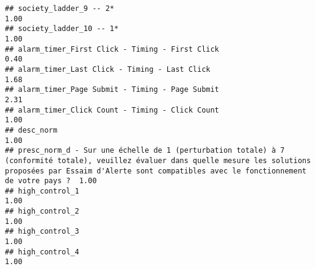 \documentclass[
]{article}
\begin{document}
\begin{verbatim}
## society_ladder_9 -- 2*                                                                                                                                                                                                      1.00
## society_ladder_10 -- 1*                                                                                                                                                                                                     1.00
## alarm_timer_First Click - Timing - First Click                                                                                                                                                                              0.40
## alarm_timer_Last Click - Timing - Last Click                                                                                                                                                                                1.68
## alarm_timer_Page Submit - Timing - Page Submit                                                                                                                                                                              2.31
## alarm_timer_Click Count - Timing - Click Count                                                                                                                                                                              1.00
## desc_norm                                                                                                                                                                                                                   1.00
## presc_norm_d - Sur une échelle de 1 (perturbation totale) à 7 (conformité totale), veuillez évaluer dans quelle mesure les solutions proposées par Essaim d'Alerte sont compatibles avec le fonctionnement de votre pays ?  1.00
## high_control_1                                                                                                                                                                                                              1.00
## high_control_2                                                                                                                                                                                                              1.00
## high_control_3                                                                                                                                                                                                              1.00
## high_control_4                                                                                                                                                                                                              1.00

\end{verbatim}
\end{document}
